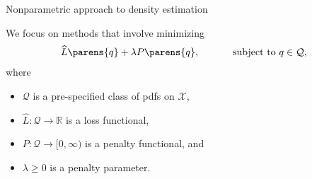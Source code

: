 \documentclass[aspectratio=169,xcolor=dvipsnames]{beamer}
\begin{document}
\begin{frame}{Nonparametric approach to density estimation}
	
%	
	
	We focus on methods that involve minimizing 
	\begin{align*}
		\widehat{L} \parens{q} + \lambda P \parens{q}, \qquad \quad \text{ subject to } q \in \mathcal{Q}, 
	\end{align*} 
	where 
	\begin{itemize}
		\item $\mathcal{Q}$ is a pre-specified class of pdfs on $\mathcal{X}$, 
		\item $\widehat{L}: \mathcal{Q} \to \mathbb{R}$ is a loss functional, 
		\item $P: \mathcal{Q} \to [0, \infty)$ is a penalty functional, and 
		\item $\lambda \ge 0$ is a penalty parameter. 
	\end{itemize}
	
\end{frame}


%	
\end{document}

